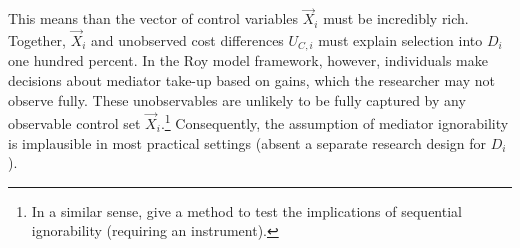 This means than the vector of control variables $\vec X_i$ must be incredibly rich.
Together, $\vec X_i$ and unobserved cost differences $U_{C,i}$ must explain selection into $D_i$ one hundred percent.
In the Roy model framework, however, individuals make decisions about mediator take-up based on gains, which the researcher may not observe fully. 
These unobservables are unlikely to be fully captured by any observable control set $\vec{X}_i$.\footnote{
    In a similar sense, \cite{huber2024testing} give a method to  test the implications of sequential ignorability (requiring an instrument).
}
Consequently, the assumption of mediator ignorability is implausible in most practical settings (absent a separate research design for $D_i$).

% 
% 
% 
% 